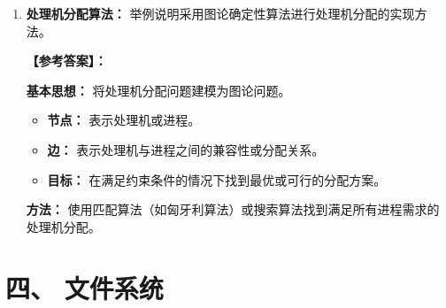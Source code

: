 \documentclass[a4paper,12pt]{article}
\newcommand{\answer}[1]{\par\vspace{0.5em}\hspace{2em}\textbf{【参考答案】：}\\{\color{blue}#1}\par\vspace{1em}}
\begin{document}
\begin{enumerate}[label=\arabic*.]
    \answer{
    \textbf{基本思想：} 使用三个相同的模块执行相同的任务，通过投票器选择多数一致的结果作为输出。
    
    \textbf{处理 Byzantine 故障：}
    \begin{itemize}
        \item \textbf{可以处理：} 随机故障（如模块产生错误输出）。
        \item \textbf{不能处理：} Byzantine 故障（模块故意产生不一致的错误输出）。
    \end{itemize}
    
    \textbf{原因：} 三个模块可能产生三种不同的输出，投票器无法判断哪个是正确的。
    }

    \item \textbf{处理机分配算法：}
    举例说明采用图论确定性算法进行处理机分配的实现方法。
    
    \answer{
    \textbf{基本思想：} 将处理机分配问题建模为图论问题。
    \begin{itemize}
        \item \textbf{节点：} 表示处理机或进程。
        \item \textbf{边：} 表示处理机与进程之间的兼容性或分配关系。
        \item \textbf{目标：} 在满足约束条件的情况下找到最优或可行的分配方案。
    \end{itemize}
    
    \textbf{方法：} 使用匹配算法（如匈牙利算法）或搜索算法找到满足所有进程需求的处理机分配。
    }
\end{enumerate}

\section{四、 文件系统}
\end{document}
